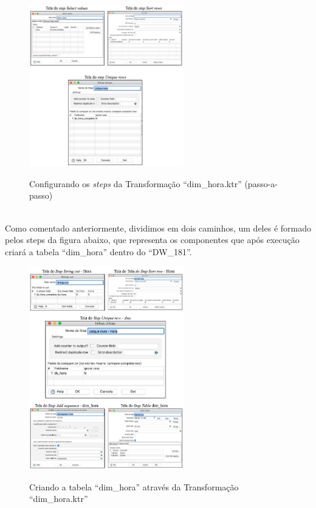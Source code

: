 \begin{figure}[H]
	\vspace*{0,2cm}
    \centering
    \caption{Configurando os \textit{steps} da Transforma\c{c}\~{a}o ``dim\_hora.ktr'' (passo-a-passo)}
    \includegraphics[width=0.6\textwidth]{./04-figuras/figura-dim-hora-passo-a-passo}
    \label{fig:ilustfigdimhorapassoapasso}
\end{figure}
\vspace*{-0,9cm}
{\raggedright {}} \\

Como comentado anteriormente, dividimos em dois caminhos, um deles \'{e} formado pelos steps da figura abaixo, 
que representa os componentes que ap\'{o}s execu\c{c}\~{a}o criar\'{a} a tabela ``dim\_hora'' dentro do ``DW\_181''.

\begin{figure}[H]
	\vspace*{0,2cm}
    \centering
    \caption{Criando a tabela ``dim\_hora'' atrav\'{e}s da Transforma\c{c}\~{a}o ``dim\_hora.ktr''}
    \includegraphics[width=0.6\textwidth]{./04-figuras/figura-trans-dim-hora}
    \label{fig:ilustfigtbdimhora}
\end{figure}
\vspace*{-0,9cm}
{\raggedright {}} \\

